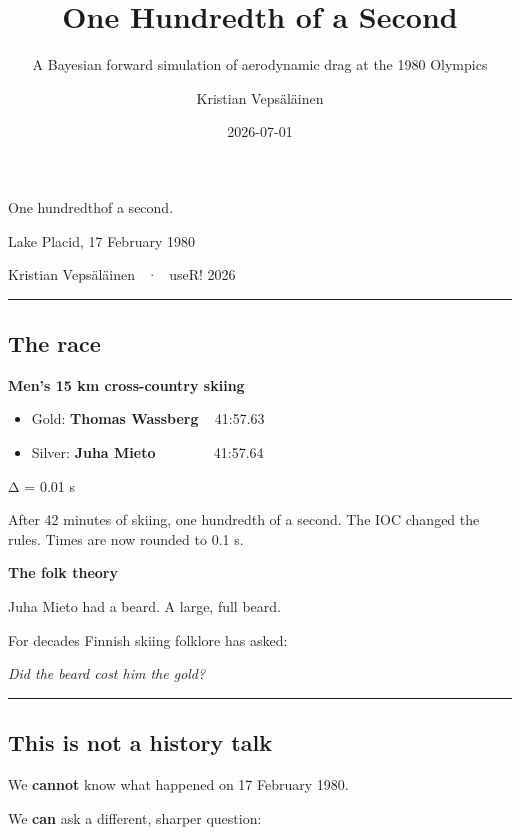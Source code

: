 \documentclass[
  letterpaper,
  DIV=11,
  numbers=noendperiod]{scrartcl}
\title{One Hundredth of a Second}
\subtitle{A Bayesian forward simulation of aerodynamic drag at the 1980
Olympics}
\author{Kristian Vepsäläinen}
\date{2026-07-01}
\providecommand{\tightlist}{%
  \setlength{\itemsep}{0pt}\setlength{\parskip}{0pt}}
\begin{document}
\maketitle


\subsection{}\label{section}

One hundredthof a second.

Lake Placid, 17 February 1980

Kristian Vepsäläinen ~·~ useR! 2026

\begin{center}\rule{0.5\linewidth}{0.5pt}\end{center}

\subsection{The race}\label{the-race}

\textbf{Men's 15 km cross-country skiing}

\begin{itemize}
\tightlist
\item
  Gold: \textbf{Thomas Wassberg} ~ 41:57.63
\item
  Silver: \textbf{Juha Mieto} ~~~~~~~ 41:57.64
\end{itemize}

Δ = 0.01 s

After 42 minutes of skiing, one hundredth of a second. The IOC changed
the rules. Times are now rounded to 0.1 s.

\textbf{The folk theory}

Juha Mieto had a beard. A large, full beard.

For decades Finnish skiing folklore has asked:

\emph{Did the beard cost him the gold?}

\begin{center}\rule{0.5\linewidth}{0.5pt}\end{center}

\subsection{This is not a history
talk}\label{this-is-not-a-history-talk}

We \textbf{cannot} know what happened on 17 February 1980.

We \textbf{can} ask a different, sharper question:
\end{document}
